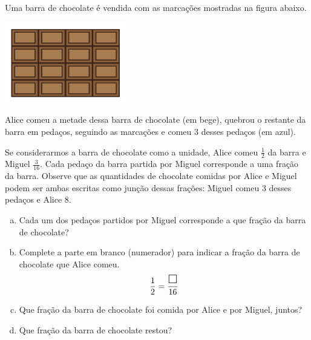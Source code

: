\begin{atividade}[label=chap5-ativ3]{}


Uma barra de chocolate é vendida com as marcações mostradas na figura abaixo.

 \begin{center}
 \includegraphics[width=150pt, keepaspectratio]{../figuras/licao05/ativ3_fig01.png}
 \end{center}


Alice comeu a metade dessa barra de chocolate (em bege), quebrou o restante da barra em pedaços, seguindo as marcações e comeu 3 desses pedaços (em azul).

\begin{center}
\end{center}

Se considerarmos a barra de chocolate como a unidade, Alice comeu $\frac{1}{2}$ da barra e Miguel $\frac{3}{16}$. Cada pedaço da barra partida por Miguel corresponde a uma fração da barra. Observe que as quantidades de chocolate comidas por Alice e Miguel podem ser ambas escritas como junção dessas frações: Miguel comeu 3 desses pedaços e Alice 8.
\begin{enumerate}[a)]
\item Cada um dos pedaços partidos por Miguel corresponde a que fração da barra de chocolate?
\item Complete a parte em branco (numerador) para indicar a fração da barra de chocolate que Alice comeu.
$$\frac{1}{2} = \frac{\text{\Large $\square$} }{16}$$
\item Que fração da barra de chocolate foi comida por Alice e por Miguel, juntos?
\item  Que fração da barra de chocolate restou?
\end{enumerate}
\end{atividade}

